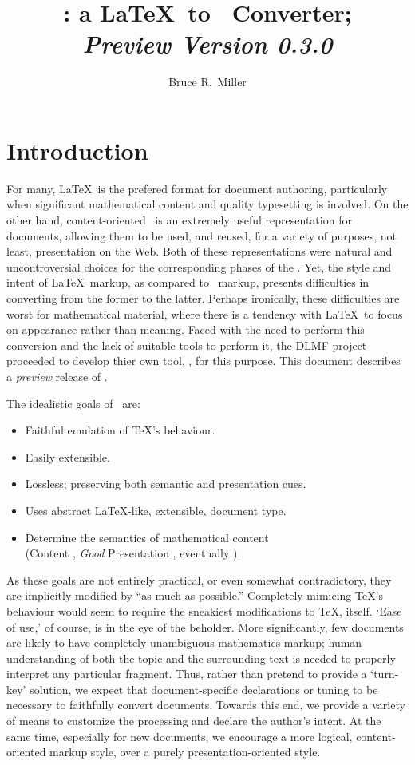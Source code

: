 \documentclass{article}
\title{\LaTeXML: a \LaTeX\ to \XML\ Converter; \\
       \emph{Preview Version 0.3.0}}
\author{Bruce R.~Miller}
\begin{document}
\maketitle
\section{Introduction}
For many, \LaTeX\ is the prefered format for document authoring, particularly when
significant mathematical content and quality typesetting is involved.
On the other hand, content-oriented \XML\ is an extremely useful representation for documents,
allowing them to be used, and reused, for a variety of purposes, not least, 
presentation on the Web.  Both of these representations were natural and uncontroversial
choices for the corresponding phases of
the .
Yet, the style and intent of \LaTeX\ markup, as compared to \XML\
markup, presents difficulties in converting from the former to the latter.
Perhaps ironically, these difficulties are worst for mathematical material, where
there is a tendency with \LaTeX\ to focus on appearance rather than meaning.
Faced with the need to perform this conversion and the lack of suitable tools to perform it, 
the DLMF project proceeded to develop thier own tool, \LaTeXML, for this purpose.
This document describes a \emph{preview} release of \LaTeXML.

The idealistic goals of \LaTeXML\ are:
\begin{itemize}
\item Faithful emulation of \TeX's behaviour.
\item Easily extensible.
\item Lossless; preserving both semantic and presentation cues.
\item Uses abstract \LaTeX-like, extensible, document type.
\item Determine the semantics of mathematical content\\
    (Content \MathML, \emph{Good} Presentation \MathML, eventually \OpenMath).
\end{itemize}

As these goals are not entirely practical, or even somewhat contradictory,
they are implicitly modified by ``as much as possible.''
Completely mimicing \TeX's behaviour would seem to require the sneakiest modifications
to \TeX, itself.  `Ease of use,' of course, is in the eye of the beholder.
More significantly, few documents are likely to have completely unambiguous
mathematics markup; human understanding of both the topic and the surrounding 
text is needed to properly interpret any particular fragment.
Thus, rather than pretend to provide a `turn-key' solution,
we expect that document-specific declarations or tuning to be necessary
to faithfully convert documents.  Towards this end, we provide a variety
of means to customize the processing and declare the author's intent.
At the same time, especially for new documents, we encourage a more logical, 
content-oriented markup style, over a purely presentation-oriented style.
\end{document}
